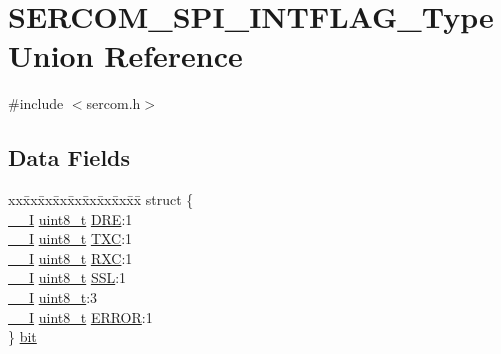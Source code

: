 \hypertarget{union_s_e_r_c_o_m___s_p_i___i_n_t_f_l_a_g___type}{}\section{S\+E\+R\+C\+O\+M\+\_\+\+S\+P\+I\+\_\+\+I\+N\+T\+F\+L\+A\+G\+\_\+\+Type Union Reference}
\label{union_s_e_r_c_o_m___s_p_i___i_n_t_f_l_a_g___type}


{\ttfamily \#include $<$sercom.\+h$>$}

\subsection*{Data Fields}
\begin{DoxyCompactItemize}
\item 
\begin{tabbing}
xx\=xx\=xx\=xx\=xx\=xx\=xx\=xx\=xx\=\kill
struct \{\\
\>\mbox{\hyperlink{core__cm0plus_8h_af63697ed9952cc71e1225efe205f6cd3}{\_\_I}} \mbox{\hyperlink{union_s_e_r_c_o_m___s_p_i___i_n_t_f_l_a_g___type_a5b4208c6f4c4a4290c4f2804d1eb1d5b}{uint8\_t}} \mbox{\hyperlink{union_s_e_r_c_o_m___s_p_i___i_n_t_f_l_a_g___type_a3e0c17296e30aaa4ad96a7effe9a00b0}{DRE}}:1\\
\>\mbox{\hyperlink{core__cm0plus_8h_af63697ed9952cc71e1225efe205f6cd3}{\_\_I}} \mbox{\hyperlink{union_s_e_r_c_o_m___s_p_i___i_n_t_f_l_a_g___type_a5b4208c6f4c4a4290c4f2804d1eb1d5b}{uint8\_t}} \mbox{\hyperlink{union_s_e_r_c_o_m___s_p_i___i_n_t_f_l_a_g___type_a79c6db23e2db2b1ff2aded896a392fb3}{TXC}}:1\\
\>\mbox{\hyperlink{core__cm0plus_8h_af63697ed9952cc71e1225efe205f6cd3}{\_\_I}} \mbox{\hyperlink{union_s_e_r_c_o_m___s_p_i___i_n_t_f_l_a_g___type_a5b4208c6f4c4a4290c4f2804d1eb1d5b}{uint8\_t}} \mbox{\hyperlink{union_s_e_r_c_o_m___s_p_i___i_n_t_f_l_a_g___type_a6a70680cf18df53069f66ae6df6506ff}{RXC}}:1\\
\>\mbox{\hyperlink{core__cm0plus_8h_af63697ed9952cc71e1225efe205f6cd3}{\_\_I}} \mbox{\hyperlink{union_s_e_r_c_o_m___s_p_i___i_n_t_f_l_a_g___type_a5b4208c6f4c4a4290c4f2804d1eb1d5b}{uint8\_t}} \mbox{\hyperlink{union_s_e_r_c_o_m___s_p_i___i_n_t_f_l_a_g___type_accf7afb198b7a82968ea98c8ce8f72df}{SSL}}:1\\
\>\mbox{\hyperlink{core__cm0plus_8h_af63697ed9952cc71e1225efe205f6cd3}{\_\_I}} \mbox{\hyperlink{union_s_e_r_c_o_m___s_p_i___i_n_t_f_l_a_g___type_a5b4208c6f4c4a4290c4f2804d1eb1d5b}{uint8\_t}}:3\\
\>\mbox{\hyperlink{core__cm0plus_8h_af63697ed9952cc71e1225efe205f6cd3}{\_\_I}} \mbox{\hyperlink{union_s_e_r_c_o_m___s_p_i___i_n_t_f_l_a_g___type_a5b4208c6f4c4a4290c4f2804d1eb1d5b}{uint8\_t}} \mbox{\hyperlink{union_s_e_r_c_o_m___s_p_i___i_n_t_f_l_a_g___type_ab083f63120ce20369e2dbb0081da16e3}{ERROR}}:1\\
\} \mbox{\hyperlink{union_s_e_r_c_o_m___s_p_i___i_n_t_f_l_a_g___type_ad0e33a656c9c3f1d9300a94ba8ba2f3f}{bit}}\\


\end{tabbing}
\end{DoxyCompactItemize}
